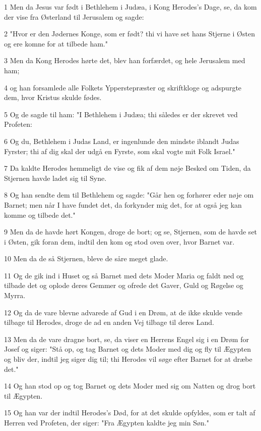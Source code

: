 \par 1 Men da Jesus var født i Bethlehem i Judæa, i Kong Herodes's Dage, se, da kom der vise fra Østerland til Jerusalem og sagde:
\par 2 "Hvor er den Jødernes Konge, som er født? thi vi have set hans Stjerne i Østen og ere komne for at tilbede ham."
\par 3 Men da Kong Herodes hørte det, blev han forfærdet, og hele Jerusalem med ham;
\par 4 og han forsamlede alle Folkets Ypperstepræster og skriftkloge og adspurgte dem, hvor Kristus skulde fødes.
\par 5 Og de sagde til ham: "I Bethlehem i Judæa; thi således er der skrevet ved Profeten:
\par 6 Og du, Bethlehem i Judas Land, er ingenlunde den mindste iblandt Judas Fyrster; thi af dig skal der udgå en Fyrste, som skal vogte mit Folk Israel."
\par 7 Da kaldte Herodes hemmeligt de vise og fik af dem nøje Besked om Tiden, da Stjernen havde ladet sig til Syne.
\par 8 Og han sendte dem til Bethlehem og sagde: "Går hen og forhører eder nøje om Barnet; men når I have fundet det, da forkynder mig det, for at også jeg kan komme og tilbede det."
\par 9 Men da de havde hørt Kongen, droge de bort; og se, Stjernen, som de havde set i Østen, gik foran dem, indtil den kom og stod oven over, hvor Barnet var.
\par 10 Men da de så Stjernen, bleve de såre meget glade.
\par 11 Og de gik ind i Huset og så Barnet med dets Moder Maria og faldt ned og tilbade det og oplode deres Gemmer og ofrede det Gaver, Guld og Røgelse og Myrra.
\par 12 Og da de vare blevne advarede af Gud i en Drøm, at de ikke skulde vende tilbage til Herodes, droge de ad en anden Vej tilbage til deres Land.
\par 13 Men da de vare dragne bort, se, da viser en Herrens Engel sig i en Drøm for Josef og siger: "Stå op, og tag Barnet og dets Moder med dig og fly til Ægypten og bliv der, indtil jeg siger dig til; thi Herodes vil søge efter Barnet for at dræbe det."
\par 14 Og han stod op og tog Barnet og dets Moder med sig om Natten og drog bort til Ægypten.
\par 15 Og han var der indtil Herodes's Død, for at det skulde opfyldes, som er talt af Herren ved Profeten, der siger: "Fra Ægypten kaldte jeg min Søn."
